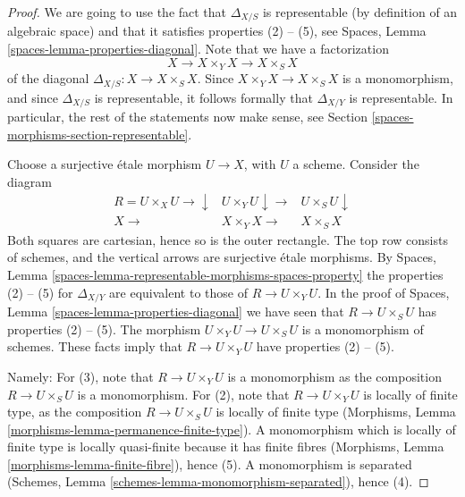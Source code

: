 \begin{proof}
We are going to use the fact that $\Delta_{X/S}$ is
representable (by definition of an algebraic space) and that
it satisfies properties (2) -- (5), see
Spaces, Lemma \ref{spaces-lemma-properties-diagonal}.
Note that we have a factorization
$$
X
\longrightarrow
X \times_Y X
\longrightarrow
X \times_S X
$$
of the diagonal $\Delta_{X/S} : X \to X \times_S X$. Since
$X \times_Y X \to X \times_S X$ is a monomorphism, and since
$\Delta_{X/S}$ is representable, it follows formally that
$\Delta_{X/Y}$ is representable. In particular, the rest of
the statements now make sense, see
Section \ref{spaces-morphisms-section-representable}.

\medskip\noindent
Choose a surjective \'etale morphism $U \to X$, with $U$ a scheme.
Consider the diagram
$$
\begin{array}{ccc}R = U \times_X U \longrightarrow\downarrow & U \times_Y U \downarrow\longrightarrow & U \times_S U \downarrow \\ X \longrightarrow & X \times_Y X \longrightarrow & X \times_S X\end{array}
$$
Both squares are cartesian, hence so is the outer rectangle.
The top row consists of schemes, and the vertical arrows
are surjective \'etale morphisms. By
Spaces, Lemma \ref{spaces-lemma-representable-morphisms-spaces-property}
the properties (2) -- (5) for $\Delta_{X/Y}$ are equivalent to those of
$R \to U \times_Y U$. In the proof of
Spaces, Lemma \ref{spaces-lemma-properties-diagonal}
we have seen that $R \to U \times_S U$ has properties (2) -- (5).
The morphism $U \times_Y U \to U \times_S U$ is a monomorphism
of schemes. These facts imply that $R \to U \times_Y U$ have
properties (2) -- (5).

\medskip\noindent
Namely: For (3), note that $R \to U \times_Y U$
is a monomorphism as the composition
$R \to U \times_S U$ is a monomorphism. For (2), note that
$R \to U \times_Y U$ is locally of finite type, as the
composition $R \to U \times_S U$ is locally of finite type
(Morphisms, Lemma \ref{morphisms-lemma-permanence-finite-type}).
A monomorphism which is locally of finite type is locally quasi-finite
because it has finite fibres
(Morphisms, Lemma \ref{morphisms-lemma-finite-fibre}), hence (5).
A monomorphism is separated
(Schemes, Lemma \ref{schemes-lemma-monomorphism-separated}), hence (4).
\end{proof}


